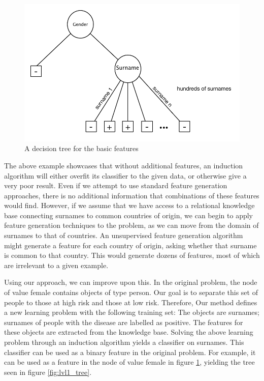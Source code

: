 \documentclass[twoside,11pt]{article}
\theoremstyle{definition}
\begin{document}
\begin{figure}
	\centering
	\includegraphics[width=\linewidth]{fig1.pdf}
	\caption{A decision tree for the basic features}
	\label{fig:tree_base}
\end{figure}

The above example showcases that without additional features, an induction algorithm will either overfit its classifier to the given data, or otherwise give a very poor result. Even if we attempt to use standard feature generation approaches, there is no additional information that combinations of these features would find.
However, if we assume that we have access to a relational knowledge base connecting surnames to common countries of origin, we can begin to apply feature generation techniques to the problem, as we can move from the domain of surnames to that of countries. An unsupervised feature generation algorithm might generate a feature for each country of origin, asking whether that surname is common to that country. This would generate dozens of features, most of which are irrelevant to a given example.

Using our approach, we can improve upon this. In the original problem, the node of value female contains objects of type person. Our goal is to separate this set of people to those at high risk and those at low risk. Therefore, Our method defines a new learning problem with the following training set: The objects are surnames; surnames of people with the disease are labelled as positive. The features for these objects are extracted from the knowledge base.
Solving the above learning problem through an induction algorithm yields a classifier on surnames. This classifier can be used as a binary feature in the original problem. For example, it can be used as a feature in the node of value female in figure \ref{fig:tree_base}, yielding the tree seen in figure \ref{fig:lvl1_tree}. 
\end{document}
